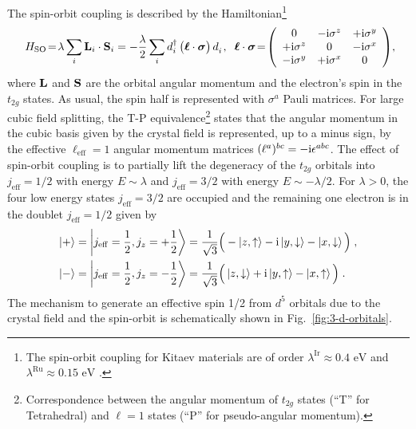 The spin-orbit coupling is described by the Hamiltonian\footnote{
The spin-orbit coupling for Kitaev materials are of order $\lambda^{\mathrm{Ir}}\approx 0.4\text{ eV}$ \cite{Kim_2014} and  $\lambda^{\mathrm{Ru}}\approx 0.15\text{ eV}$ \cite{Banerjee_2016}.}
\begin{equation}
    H_{\mathrm{SO}}\! = \!\lambda \sum_i   \mathbf{L}_i \cdot \mathbf{S}_i
    =- \frac{\lambda}{2} \sum_i  d_i^\dagger \, \big( \bm{\ell}  \cdot \bm{\sigma}\big) \,d_i^{\phantom{\dagger}} ,  \;\;
    \bm{\ell}  \cdot \bm{\sigma}\!=\!\left( \begin{array}{ccc}
       0 & - \mathrm{i} \sigma^z  & +\mathrm{i} \sigma^y  \\
       +\mathrm{i} \sigma^z & 0  & - \mathrm{i} \sigma^x \\
       -\mathrm{i} \sigma^y & + \mathrm{i} \sigma^x & 0 \\
    \end{array} \right) \! , \!\!
\end{equation}
where $\mathbf{L}$ and $\mathbf S$ are the orbital angular momentum and the electron's spin in the  $t_{2g}$ states. As usual, the spin half is represented with $\sigma^a$ Pauli matrices.  %
For large cubic field splitting, the T-P equivalence\footnote{Correspondence between the angular momentum of $t_{2g}$  states (``T'' for Tetrahedral) and $\ell=1$ states (``P'' for pseudo-angular momentum). }\cite{Sugano_1970} states that the angular momentum in the cubic basis given by the crystal field is represented, up to a minus sign, by the effective $\ell_{\text{eff}}=1$ angular momentum matrices $(\ell^a)^{bc} = -\mathrm{i} \epsilon^{abc}$.
The effect of spin-orbit coupling is to partially lift the degeneracy of the $t_{2g}$ orbitals into $j_{\mathrm{eff}}=1/2$ with energy $E\sim\lambda$ and $j_{\mathrm{eff}}=3/2$ with energy $E\sim-\lambda/2$. For $\lambda > 0$, the four low energy states $j_{\mathrm{eff}}=3/2$ are occupied and the remaining one electron is in the doublet $j_{\mathrm{eff}}=1/2$ given by
\begin{equation}
    \begin{split}
        \ket{+} = {\scriptsize \left|j_{\mathrm{eff}}=\frac{1}{2},j_z=+\frac{1}{2} \right> } &= \frac{1}{\sqrt{3}} \Big( - \ket{z,\uparrow} - \mathrm{i} \ket{y,\downarrow} - \ket{x,\downarrow} \Big) \; , \\
        \ket{-} = \left|j_{\mathrm{eff}}=\frac{1}{2},j_z=-\frac{1}{2} \right> &= \frac{1}{\sqrt{3}} \Big( \ket{z,\downarrow} + \mathrm{i} \ket{y,\uparrow} - \ket{x,\uparrow} \Big) \; . \label{eq:jeff+-}
    \end{split}
\end{equation}
The mechanism to generate an effective spin 1/2 from $d^5$ orbitals due to the crystal field and the spin-orbit is schematically shown in Fig.~\ref{fig:3-d-orbitals}.

